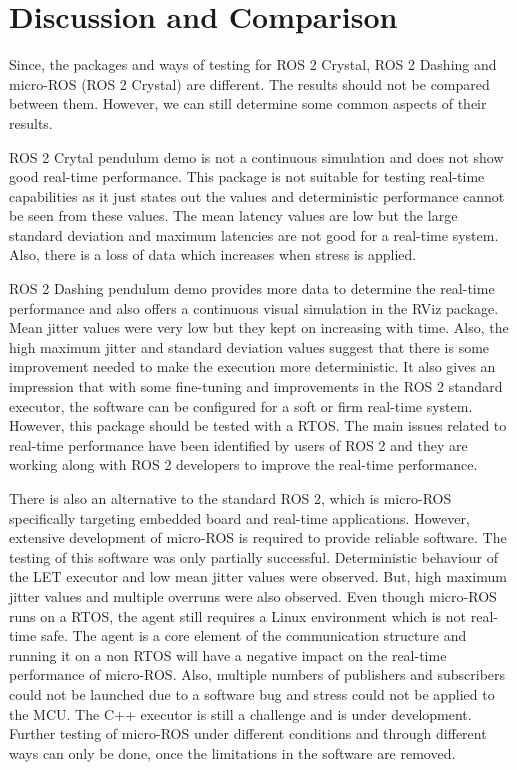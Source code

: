 \documentclass[%
xelatex,
	oneside,		%
	12pt,			%
	parskip=half,	%
	abstracton,
	chapterprefix=true%
    appendixprefix=true]
{scrbook}
\begin{document}
		\section{Discussion and Comparison}
		\vspace*{0.25cm}
	Since, the packages and ways of testing for ROS 2 Crystal, ROS 2 Dashing and micro-ROS (ROS 2 Crystal) are different. The results should not be compared between them. However, we can still determine some common aspects of their results.
	
	\vspace*{0.25cm}
	ROS 2 Crytal pendulum demo is not a continuous simulation and does not show good real-time performance. This package is not suitable for testing real-time capabilities as it just states out the values and deterministic performance cannot be seen from these values. The mean latency values are low but the large standard deviation and maximum latencies are not good for a real-time system. Also, there is a loss of data which increases when stress is applied. 
	\vspace*{0.25cm}
	
	ROS 2 Dashing pendulum demo provides more data to determine the real-time performance and also offers a continuous visual simulation in the RViz package. Mean jitter values were very low but they kept on increasing with time. Also, the high maximum jitter and standard deviation values suggest that there is some improvement needed to make the execution more deterministic. It also gives an impression that with some fine-tuning and improvements in the ROS 2 standard executor, the software can be configured for a soft or firm real-time system. However, this package should be tested with a RTOS. The main issues related to real-time performance have been identified by users of ROS 2 and they are working along with ROS 2 developers to improve the real-time performance.
	
	\vspace*{0.25cm}
	There is also an alternative to the standard ROS 2, which is micro-ROS specifically targeting embedded board and real-time applications. However, extensive development of micro-ROS is required to provide reliable software. The testing of this software was only partially successful.  Deterministic behaviour of the LET executor and low mean jitter values were observed. But, high maximum jitter values and multiple overruns were also observed. Even though micro-ROS runs on a RTOS, the agent still requires a Linux environment which is not real-time safe. The agent is a core element of the communication structure and running it on a non RTOS will have a negative impact on the real-time performance of micro-ROS. Also, multiple numbers of publishers and subscribers could not be launched due to a software bug and stress could not be applied to the MCU. The C++ executor is still a challenge and is under development. Further testing of micro-ROS under different conditions and through different ways can only be done, once the limitations in the software are removed. 
\end{document}
